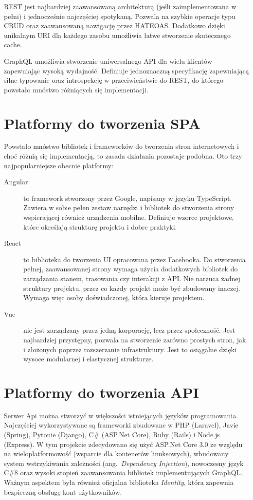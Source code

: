 		REST jest najbardziej zaawansowaną architekturą (jeśli zaimplementowana w pełni) i jednocześnie najczęściej spotykaną.
		Pozwala na szybkie operacje typu CRUD oraz zaawansowaną nawigację przez HATEOAS.
		Dodatkowo dzięki unikalnym URI dla każdego zasobu umożliwia łatwe stworzenie skutecznego cache.

		GraphQL umożliwia stworzenie uniwersalnego API dla wielu klientów zapewniając wysoką wydajność.
		Definiuje jednoznaczną specyfikację zapewniającą silne typowanie oraz introspekcję w przeciwieństwie do REST,
		do którego powstało mnóstwo różniących się implementacji.

\section{Platformy do tworzenia SPA}
	Powstało mnóstwo bibliotek i frameworków do tworzenia stron internetowych i choć różnią się implementacją, to zasada działania pozostaje podobna.
	Oto trzy najpopularniejsze obecnie platformy:
	\begin{description}
		\item[Angular] to framework stworzony przez Google, napisany w języku TypeScript.
			Zawiera w sobie pełen zestaw narzędzi i bibliotek do stworzenia strony wspierającej również urządzenia mobilne.
			Definiuje wzorce projektowe, które określają strukturę projektu i dobre praktyki.

		\item[React] to biblioteka do tworzenia UI opracowana przez Facebooka.
			Do stworzenia pełnej, zaawansowanej strony wymaga użycia dodatkowych bibliotek do zarządzania stanem, trasowania czy interakcji z API.
			Nie narzuca żadnej struktury projektu, przez co każdy projekt może być zbudowany inaczej.
			Wymaga więc osoby doświadczonej, która kieruje projektem.

		\item[Vue] nie jest zarządzany przez jedną korporację, lecz przez społeczność.
			Jest najbardziej przystępny, pozwala na stworzenie zarówno prostych stron, jak i złożonych poprzez rozszerzanie infrastruktury.
			Jest to osiągalne dzięki wysoce modularnej i elastycznej strukturze.
	\end{description}

\section{Platformy do tworzenia API}
	Serwer Api można stworzyć w większości istniejących języków programowania.
	Najczęściej wykorzystywane są frameworki zbudowane w PHP (Laravel), Javie (Spring), Pytonie (Django), C\# (ASP.Net Core), Ruby (Rails) i Node.js (Express).
	W tym projekcie zdecydowano się użyć ASP.Net Core 3.0 ze względu na wieloplatformowość (wsparcie dla kontenerów linuksowych),
	wbudowany system wstrzykiwania zależności (ang.\ \emph{Dependency Injection}), nowoczesny język C\#8 oraz wysoki stopień zaawansowania bibliotek implementujących GraphQL.
	Ważnym aspektem była również oficjalna biblioteka \emph{Identity}, która zapewnia bezpieczną obsługę kont użytkowników.

